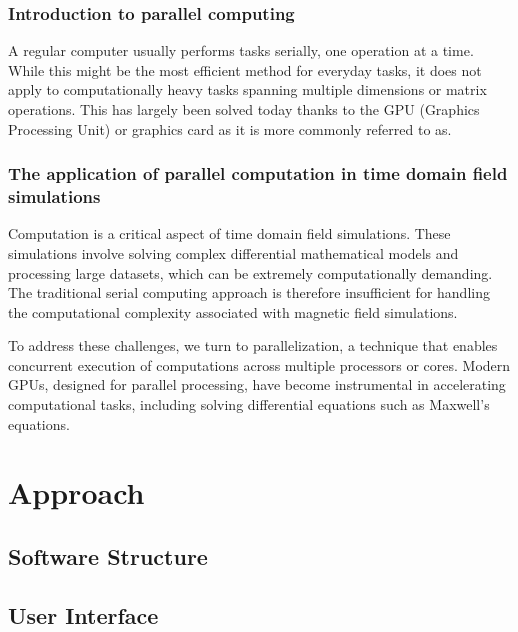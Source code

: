 \documentclass[11pt, a4paper, titlepage]{article}
\begin{document}
\subsubsection{Introduction to parallel computing}
A regular computer usually performs tasks serially, one operation at a time. While this might be the most efficient method for everyday tasks, it does not apply to computationally heavy tasks spanning multiple dimensions or matrix operations. This has largely been solved today thanks to the GPU (Graphics Processing Unit) or graphics card as it is more commonly referred to as.
\subsubsection{The application of parallel computation in time domain field simulations}
Computation is a critical aspect of time domain field simulations. These simulations involve solving complex differential mathematical models and processing large datasets, which can be extremely computationally demanding. The traditional serial computing approach is therefore insufficient for handling the computational complexity associated with magnetic field simulations.

To address these challenges, we turn to parallelization, a technique that enables concurrent execution of computations across multiple processors or cores. Modern GPUs, designed for parallel processing, have become instrumental in accelerating computational tasks, including solving differential equations such as Maxwell's equations.




\fi
\newpage
\section{Approach}

\subsection{Software Structure}




\subsection{User Interface}
\end{document}
